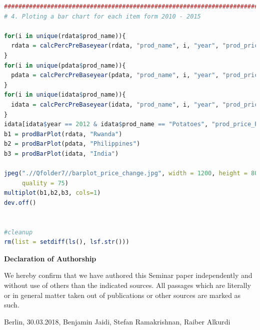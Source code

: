\documentclass[11pt]{article}
\begin{document}
\begin{lstlisting}[language= R]
#######################################################################################################
# 4. Ploting a bar chart for each item form 2010 - 2015

for(i in unique(rdata$prod_name)){
  rdata = calcPercPreBaseyear(rdata, "prod_name", i, "year", "prod_price")
}
for(i in unique(pdata$prod_name)){
  pdata = calcPercPreBaseyear(pdata, "prod_name", i, "year", "prod_price")
}
for(i in unique(idata$prod_name)){
  idata = calcPercPreBaseyear(idata, "prod_name", i, "year", "prod_price")
}
idata[idata$year == 2012 & idata$prod_name == "Potatoes", "prod_price_Percent"] = 0
b1 = prodBarPlot(rdata, "Rwanda")
b2 = prodBarPlot(pdata, "Philippines")
b3 = prodBarPlot(idata, "India")

jpeg(".//Qfolder7//barplot_price_change.jpg", width = 1200, height = 800, units = "px", pointsize = 12,
     quality = 75)
multiplot(b1,b2,b3, cols=1)
dev.off()


#cleanup
rm(list = setdiff(ls(), lsf.str()))
\end{lstlisting}


\newpage
\textbf{Declaration of Authorship} \hfill \break
\hfill \break

We hereby confirm that we have authored this Seminar paper independently and without use 
of others than the indicated sources. All passages which are literally or in general matter taken 
out of publications or other sources are marked as such. 

Berlin, 30.03.2018, Benjamin Jaidi, Stefan Ramakrishnan, Raiber Alkurdi
\end{document}
